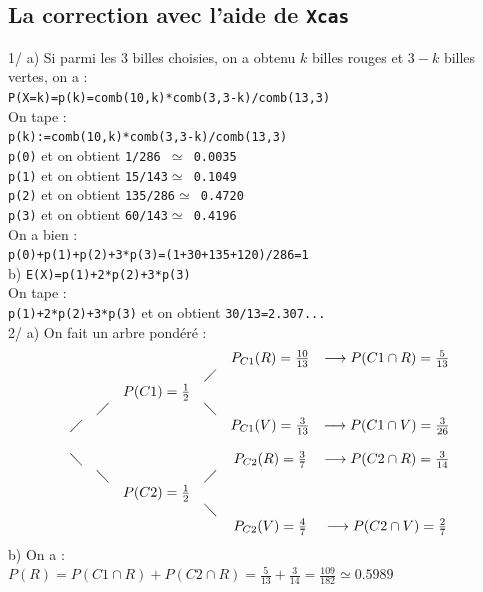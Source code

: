 \documentclass[a4paper,11pt]{book}
\begin{document}
\subsection{La correction avec l'aide de {\tt Xcas}}
1/ a) Si parmi les 3 billes choisies, on a obtenu $k$ billes rouges et 
$3-k$ billes vertes, on a :\\
{\tt P(X=k)=p(k)=comb(10,k)*comb(3,3-k)/comb(13,3)}\\
On tape :\\
{\tt p(k):=comb(10,k)*comb(3,3-k)/comb(13,3)}\\
{\tt p(0)} et on obtient {\tt 1/286 $\simeq$ 0.0035}\\
{\tt p(1)} et on obtient {\tt 15/143$\simeq$ 0.1049}\\
{\tt p(2)} et on obtient {\tt 135/286$\simeq$ 0.4720}\\
{\tt p(3)} et on obtient {\tt 60/143$\simeq$ 0.4196}\\
On a bien :\\
{\tt p(0)+p(1)+p(2)+3*p(3)=(1+30+135+120)/286=1}\\
b) {\tt E(X)=p(1)+2*p(2)+3*p(3)}\\
On tape :\\
{\tt p(1)+2*p(2)+3*p(3)} et on obtient {\tt 30/13=2.307...}\\
2/ a) On fait un arbre pond\'er\'e :
$$
\begin{array}{cccccc}
& & & &P_{C1}(R)=\frac{10}{13} &\longrightarrow P(C1 \cap R)=\frac{5}{13} \\
& & &\diagup& & \\
& &P(C1)=\frac{1}{2} & & & \\
&\diagup& &\diagdown & & \\
\diagup& & & &P_{C1}(V)=\frac{3}{13} &\longrightarrow P(C1 \cap V)=\frac{3}{26}\\
\ \\
\diagdown& & & & P_{C2}(R)=\frac{3}{7}&\longrightarrow P(C2 \cap R)=\frac{3}{14}\\
& \diagdown& &\diagup & & \\
& &P(C2)=\frac{1}{2} & & & \\
& & &\diagdown& & \\
& & & &P_{C2}(V)=\frac{4}{7} &\longrightarrow P(C2 \cap V)=\frac{2}{7}\\
\end{array}
$$
b) On a :\\
$P(R)=P(C1 \cap R)+P(C2 \cap R)=\frac{5}{13} +\frac{3}{14}=\frac{109}{182}
\simeq 0.5989$\\
\end{document}
